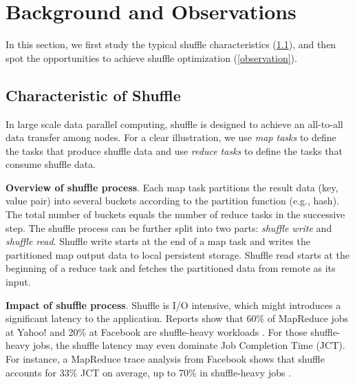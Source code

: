 \section{Background and Observations}

In this section, we first study the typical shuffle characteristics (\ref{shuffle pattern}), and then spot the opportunities to achieve shuffle optimization (\ref{observation}).
\subsection{Characteristic of Shuffle} \label{shuffle pattern}

In large scale data parallel computing, shuffle is designed to achieve an all-to-all data transfer among nodes. 
For a clear illustration, we use \textit{map tasks} to define the tasks that produce shuffle data and use \textit{reduce tasks} to define the tasks that consume shuffle data.

\textbf{Overview of shuffle process}. 
Each map task partitions the result data (key, value pair) into several buckets according to the partition function (e.g., hash). 
The total number of buckets equals the number of reduce tasks in the successive step.
The shuffle process can be further split into two parts: \textit{shuffle write} and \textit{shuffle read}. 
Shuffle write starts at the end of a map task and writes the partitioned map output data to local persistent storage. 
Shuffle read starts at the beginning of a reduce task and fetches the partitioned data from remote as its input. 

\textbf{Impact of shuffle process}. Shuffle is I/O intensive, which might introduces a significant latency to the application. 
Reports show that 60\% of MapReduce jobs at Yahoo! and 20\% at Facebook are shuffle-heavy workloads \cite{shufflewatcher}. 
For those shuffle-heavy jobs, the shuffle latency may even dominate Job Completion Time (JCT).
For instance, a MapReduce trace analysis from Facebook shows that shuffle accounts for 33\% JCT on average, up to 70\% in shuffle-heavy jobs \cite{managing}.

